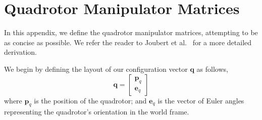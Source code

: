 

\section{Quadrotor Manipulator Matrices}
\label{app:manipulator}

In this appendix, we define the quadrotor manipulator matrices, attempting to be as concise as possible.
We refer the reader to Joubert et al.~ for a more detailed derivation.

We begin by defining the layout of our configuration vector $\mathbf{q}$ as follows,
%
\footnotesize
\begin{equation}
\mathbf{q} = 
\begin{bmatrix}
\mathbf{p}_q \\
\mathbf{e}_q
\end{bmatrix}
\end{equation}
\normalsize
%
where
$\mathbf{p}_q$ is the position of the quadrotor;
and $\mathbf{e}_q$ is the vector of Euler angles representing the quadrotor's orientation in the world frame.

